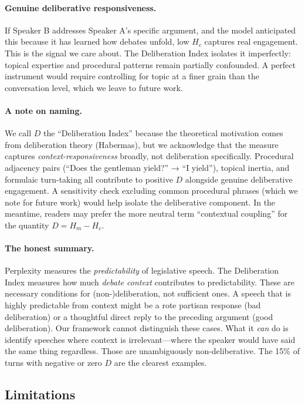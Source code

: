 \documentclass[12pt]{article}
\newcommand{\Hc}{H_c}
\newcommand{\Hm}{H_m}
\newcommand{\DI}{\mathit{D}}
\begin{document}
\paragraph{Genuine deliberative responsiveness.} If Speaker B addresses Speaker A's specific argument, and the model anticipated this because it has learned how debates unfold, low $\Hc$ captures real engagement. This is the signal we care about. The Deliberation Index isolates it imperfectly: topical expertise and procedural patterns remain partially confounded. A perfect instrument would require controlling for topic at a finer grain than the conversation level, which we leave to future work.

\paragraph{A note on naming.} We call $\DI$ the ``Deliberation Index'' because the theoretical motivation comes from deliberation theory (Habermas), but we acknowledge that the measure captures \textit{context-responsiveness} broadly, not deliberation specifically. Procedural adjacency pairs (``Does the gentleman yield?'' → ``I yield''), topical inertia, and formulaic turn-taking all contribute to positive $\DI$ alongside genuine deliberative engagement. A sensitivity check excluding common procedural phrases (which we note for future work) would help isolate the deliberative component. In the meantime, readers may prefer the more neutral term ``contextual coupling'' for the quantity $\DI = \Hm - \Hc$.

\paragraph{The honest summary.} Perplexity measures the \textit{predictability} of legislative speech. The Deliberation Index measures how much \textit{debate context} contributes to predictability. These are necessary conditions for (non-)deliberation, not sufficient ones. A speech that is highly predictable from context might be a rote partisan response (bad deliberation) or a thoughtful direct reply to the preceding argument (good deliberation). Our framework cannot distinguish these cases. What it \textit{can} do is identify speeches where context is irrelevant---where the speaker would have said the same thing regardless. Those are unambiguously non-deliberative. The 15\% of turns with negative or zero $\DI$ are the clearest examples.

\subsection{Limitations}
\end{document}
